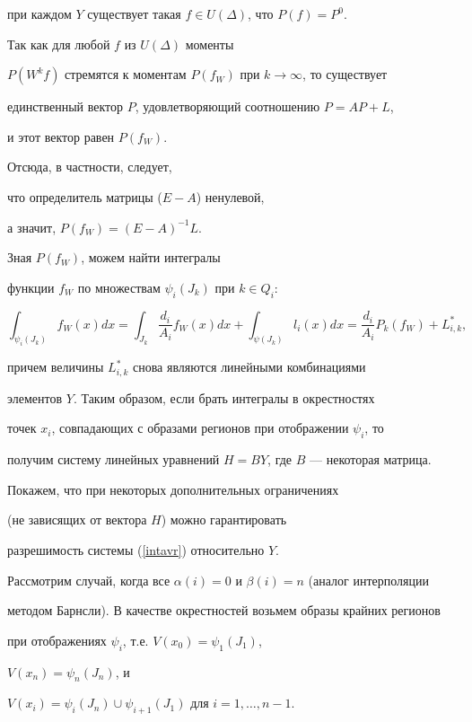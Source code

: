 при каждом $Y$ существует такая $ f \in U(\Delta) $, что $P (f) = P^0 $.


Так как для любой $f$ из $ U(\Delta) $ моменты


$P(W^k f)$ стремятся к моментам $ P(f_W) $ при $k \to \infty$, то существует


единственный вектор $ P $, удовлетворяющий соотношению $ P = AP+L $,


и этот вектор равен $P(f_W)$.


Отсюда, в частности, следует,


что определитель матрицы ($E-A$) ненулевой,


а значит, $P(f_W) = (E-A)^{-1} L $.





Зная $P(f_W)$, можем найти интегралы 


функции $f_W$ по множествам $\psi_i (J_k)$ при $k \in Q_i $:


$$


\int_{\psi_i(J_k)}f_W(x) dx = \int_{J_k} \frac{d_i}{A_i} f_W(x) dx +


\int_{\psi(J_k)} l_i(x)dx = \frac{d_i}{A_i} P_k(f_W) + L_{i,k}^*,


$$


причем величины $L_{i,k}^*$ снова являются линейными комбинациями


элементов $ Y $. Таким образом, если брать интегралы в окрестностях


точек $x_i$, совпадающих с образами регионов при отображении $\psi_i$, то


получим систему линейных уравнений $H=BY$, где $B$ --- некоторая матрица.





Покажем, что при некоторых дополнительных ограничениях


(не зависящих от вектора $H$) можно гарантировать


разрешимость системы (\ref{intavr}) относительно $Y$.


Рассмотрим случай, когда все $\alpha(i)=0$ и $\beta(i)=n$ (аналог интерполяции


методом Барнсли). В качестве окрестностей возьмем образы крайних регионов


при отображениях $\psi_i$, т.е. $V(x_0) = \psi_1(J_1)$,


$V(x_n) = \psi_n(J_n)$, и


$V(x_i) = \psi_{i}(J_n) \cup \psi_{i+1}(J_{1}) $ для $i = 1,\dotsc,n-1$.


